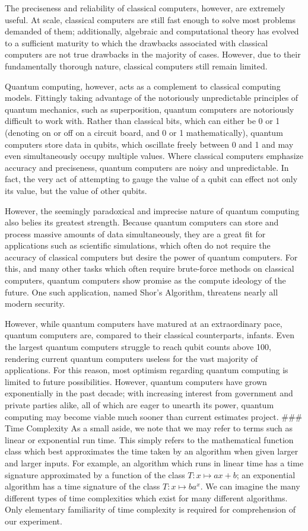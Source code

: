 \documentclass[12pt]{article}
\begin{document}
The preciseness and reliability of classical computers, however, are extremely useful. At scale, classical computers are still fast enough to solve most problems demanded of them; additionally, algebraic and computational theory has evolved to a sufficient maturity to which the drawbacks associated with classical computers are not true drawbacks in the majority of cases. However, due to their fundamentally thorough nature, classical computers still remain limited. 

Quantum computing, however, acts as a complement to classical computing models. Fittingly taking advantage of the notoriously unpredictable principles of quantum mechanics, such as superposition, quantum computers are notoriously difficult to work with. Rather than classical bits, which can either be 0 or 1 (denoting on or off on a circuit board, and 0 or 1 mathematically), quantum computers store data in qubits, which oscillate freely between 0 and 1 and may even simultaneously occupy multiple values. Where classical computers emphasize accuracy and preciseness, quantum computers are noisy and unpredictable. In fact, the very act of attempting to gauge the value of a qubit can effect not only its value, but the value of other qubits. 

However, the seemingly paradoxical and imprecise nature of quantum computing also belies its greatest strength. Because quantum computers can store and process massive amounts of data simultaneously, they are a great fit for applications such as scientific simulations, which often do not require the accuracy of classical computers but desire the power of quantum computers. For this, and many other tasks which often require brute-force methods on classical computers, quantum computers show promise as the compute ideology of the future. One such application, named Shor's Algorithm, threatens nearly all modern security. 

However, while quantum computers have matured at an extraordinary pace, quantum computers are, compared to their classical counterparts, infants. Even the largest quantum computers struggle to reach qubit counts above 100, rendering current quantum computers useless for the vast majority of applications. For this reason, most optimism regarding quantum computing is limited to future possibilities. However, quantum computers have grown exponentially in the past decade; with increasing interest from government and private parties alike, all of which are eager to unearth its power, quantum computing may become viable much sooner than current estimates project. 
### Time Complexity
As a small aside, we note that we may refer to terms such as linear or exponential run time. This simply refers to the mathematical function class which best approximates the time taken by an algorithm when given larger and larger inputs. For example, an algorithm which runs in linear time has a time signature approximated by a function of the class $T: x \mapsto ax + b$; an exponential algorithm has a time signature of the class $T: x \mapsto ba^x$. We can imagine the many different types of time complexities which exist for many different algorithms. Only elementary familiarity of time complexity is required for comprehension of our experiment.
\end{document}
